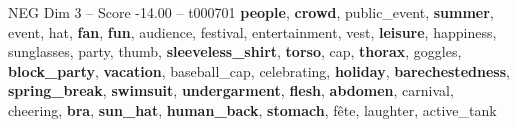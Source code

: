 \begin{textsample}{NEG Dim 3 – Score -14.00 – t000701}  \label{ex:f3_neg_025}
\textbf{people}, \textbf{crowd}, public\_event, \textbf{summer}, event, hat, \textbf{fan}, \textbf{fun}, audience, festival, entertainment, vest, \textbf{leisure}, happiness, sunglasses, party, thumb, \textbf{sleeveless\_shirt}, \textbf{torso}, cap, \textbf{thorax}, goggles, \textbf{block\_party}, \textbf{vacation}, baseball\_cap, celebrating, \textbf{holiday}, \textbf{barechestedness}, \textbf{spring\_break}, \textbf{swimsuit}, \textbf{undergarment}, \textbf{flesh}, \textbf{abdomen}, carnival, cheering, \textbf{bra}, \textbf{sun\_hat}, \textbf{human\_back}, \textbf{stomach}, fête, laughter, active\_tank

\end{textsample}
